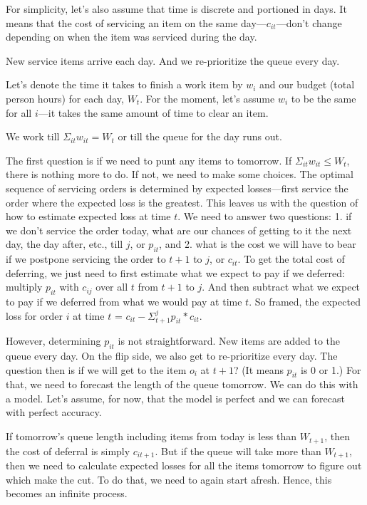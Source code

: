 \documentclass[12pt, letterpaper]{article}
\begin{document}
For simplicity, let's also assume that time is discrete and portioned in days. It means that the cost of servicing an item on the same day---$c_{it}$---don't change depending on when the item was serviced during the day.

New service items arrive each day. And we re-prioritize the queue every day.

Let's denote the time it takes to finish a work item by $w_i$ and our budget (total person hours) for each day, $W_t$. For the moment, let's assume $w_i$ to be the same for all $i$---it takes the same amount of time to clear an item.

We work till $\Sigma_{it} w_{it} = W_t$ or till the queue for the day runs out. 

The first question is if we need to punt any items to tomorrow. If $\Sigma_{it} w_{it} \leq W_t$, there is nothing more to do. If not, we need to make some choices. The optimal sequence of servicing orders is determined by expected losses---first service the order where the expected loss is the greatest. This leaves us with the question of how to estimate expected loss at time $t$. We need to answer two questions: 1. if we don't service the order today, what are our chances of getting to it the next day, the day after, etc., till $j$, or $p_{it}$, and 2. what is the cost we will have to bear if we postpone servicing the order to $t+1$ to $j$, or $c_{it}$. To get the total cost of deferring, we just need to first estimate what we expect to pay if we deferred: multiply $p_{it}$ with $c_{ij}$ over all $t$ from $t+1$ to $j$. And then subtract what we expect to pay if we deferred from what we would pay at time $t$. So framed, the expected loss for order $i$ at time $t$ = $c_{it} - \Sigma_{t+1}^{j} p_{it} * c_{it}$.

However, determining $p_{it}$ is not straightforward. New items are added to the queue every day. On the flip side, we also get to re-prioritize every day. The question then is if we will get to the item $o_i$ at $t+1$? (It means $p_{it}$ is 0 or 1.) For that, we need to forecast the length of the queue tomorrow. We can do this with a model. Let's assume, for now, that the model is perfect and we can forecast with perfect accuracy. 

If tomorrow's queue length including items from today is less than $W_{t+1}$, then the cost of deferral is simply $c_{it+1}$. But if the queue will take more than $W_{t+1}$, then we need to calculate expected losses for all the items tomorrow to figure out which make the cut. To do that, we need to again start afresh. Hence, this becomes an infinite process.
\end{document}
